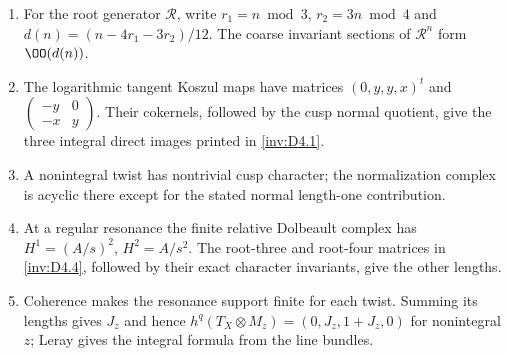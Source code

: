 \RungOne
\begin{enumerate}[label=\arabic*.]
\item For the root generator $\mathcal R$, write
$r_1=n\bmod3$, $r_2=3n\bmod4$ and
$d(n)=(n-4r_1-3r_2)/12$. The coarse invariant sections
of $\mathcal R^n$ form $\OO(d(n))$.
\item The logarithmic tangent Koszul maps have matrices
$(0,y,y,x)^t$ and
$\left(\begin{smallmatrix}-y&0\\-x&y\end{smallmatrix}\right)$.
Their cokernels, followed by the cusp normal quotient,
give the three integral direct images printed in
\ref{inv:D4.1}.
\item A nonintegral twist has nontrivial cusp character;
the normalization complex is acyclic there except for
the stated normal length-one contribution.
\item At a regular resonance the finite relative Dolbeault
complex has $H^1=(A/s)^2$, $H^2=A/s^2$. The root-three
and root-four matrices in \ref{inv:D4.4}, followed by
their exact character invariants, give the other lengths.
\item Coherence makes the resonance support finite for each
twist. Summing its lengths gives $J_z$ and hence
$h^q(T_X\otimes M_z)=(0,J_z,1+J_z,0)$ for nonintegral $z$;
Leray gives the integral formula from the line bundles.
\end{enumerate}

